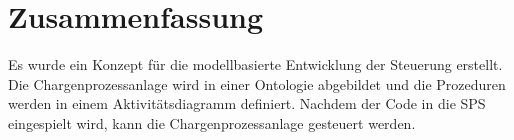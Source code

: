 \section{Zusammenfassung}
Es wurde ein Konzept für die modellbasierte Entwicklung der Steuerung erstellt. Die Chargenprozessanlage wird in einer Ontologie abgebildet und die Prozeduren werden in einem Aktivitätsdiagramm definiert. Nachdem der Code in die \ac{SPS} eingespielt wird, kann die Chargenprozessanlage gesteuert werden.








